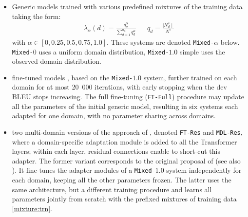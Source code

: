 \documentclass[11pt,a4paper]{article}
\newcommand{\fyTodo}[1]{\Todo[FY:]{\textcolor{orange}{#1}}}
\newcommand{\revision}[1]{\textcolor{red}{#1}}
\newcommand{\system}[1]{\texttt{{#1}}}
\begin{document}
\begin{itemize}
\itemsep0em 
\item Generic models trained with various predefined mixtures of the training data taking the form:
\begin{align} \label{mixture:trn}
\lambda_{\alpha}(d) = \frac{q_d^{\alpha}}{\displaystyle{\mathop{\sum}_{d=1}^{n_d}q_d^{\alpha}}} &&
q_d = \frac{\mid N^{s}_d \mid}{\displaystyle{N^{s}}} %
\end{align} 
with $\alpha \in [0,0.25,0.5,0.75,1.0]$. These systems are denoted \system{Mixed-$\alpha$} below. \system{Mixed-$0$} uses a uniform domain distribution, \system{Mixed-$1.0$} simple uses the observed domain distribution.
\item fine-tuned models \cite{Luong15stanford,Freitag16fast}, based on the \system{Mixed-$1.0$} system, further trained on each domain for at most 20~000 iterations, with early stopping when the dev BLEU stops increasing. The full fine-tuning (\system{FT-Full}) procedure may update all the parameters of the initial generic model, resulting in six systems each adapted for one domain, with no parameter sharing across domains.

\item two multi-domain versions of the approach of , denoted \system{FT-Res} and \system{MDL-Res}, where a domain-specific adaptation module is added to all the Transformer layers; within each layer, residual connections enable to short-cut this adapter. The former variant corresponds to the original proposal of \citet{Bapna19simple} (see also \cite{Sharaf20metalearning}). It fine-tunes the adapter modules of a \system{Mixed-$1.0$} system independently for each domain, keeping all the other parameters frozen. The latter uses the same architecture, but a different training procedure and learns all parameters jointly from scratch with the prefixed mixtures of training data \ref{mixture:trn}.\fyTodo{Keep this ?}
  

\end{itemize}
\end{document}
